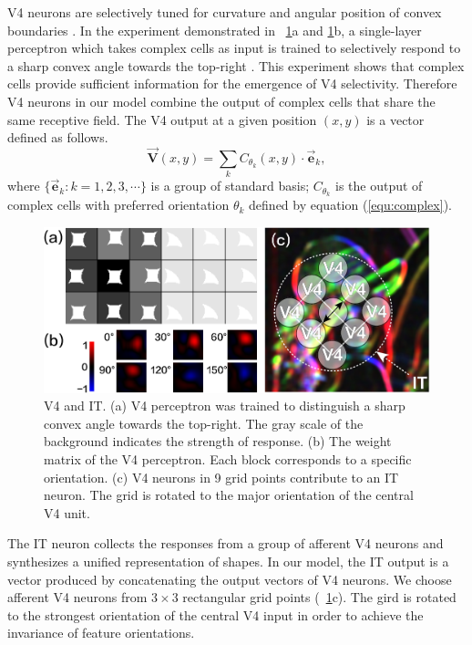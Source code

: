 \documentclass{ecai2014}
\begin{document}
V4 neurons are selectively tuned for curvature and angular position of convex boundaries \cite{Pasupathy2001}.
In the experiment demonstrated in \figurename~\ref{fig:v4it}a and \ref{fig:v4it}b,
a single-layer perceptron which takes complex cells as input is trained
to selectively respond to a sharp convex angle towards the top-right \cite{Pasupathy2001}.
This experiment shows that complex cells provide sufficient information for the emergence of V4 selectivity.
Therefore V4 neurons in our model combine the output of complex cells that share the same receptive field.
The V4 output at a given position $(x,y)$ is a vector defined as follows.
\begin{equation}
\boldsymbol{\vec{V}}(x,y) = \sum_{k} C_{\theta_k}(x,y) \cdot \boldsymbol{\vec{e}}_k,
\label{equ:v4}
\end{equation}
where $\{\boldsymbol{\vec{e}}_k:k=1,2,3,\cdots\}$ is a group of standard basis;
$C_{\theta_k}$ is the output of complex cells with preferred orientation $\theta_k$ defined by equation (\ref{equ:complex}).

\begin{figure}[h]
\centering
\includegraphics[width=0.75\linewidth]{images/fig2.png}
\caption{V4 and IT. 
(a) V4 perceptron was trained to distinguish a sharp convex angle towards the top-right.
The gray scale of the background indicates the strength of response.
(b) The weight matrix of the V4 perceptron. Each block corresponds to a specific orientation.
(c) V4 neurons in 9 grid points contribute to an IT neuron.
The grid is rotated to the major orientation of the central V4 unit.}
\label{fig:v4it}
\end{figure}

The IT neuron collects the responses from a group of afferent V4 neurons 
and synthesizes a unified representation of shapes.
In our model, the IT output is a vector produced by concatenating the output vectors of V4 neurons.
We choose afferent V4 neurons from $3\times 3$ rectangular grid points (\figurename~\ref{fig:v4it}c).
The gird is rotated to the strongest orientation of the central V4 input 
in order to achieve the invariance of feature orientations.
\end{document}
